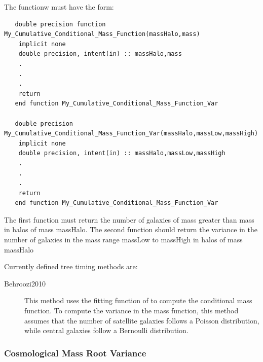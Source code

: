 The functionw must have the form:
\begin{verbatim}
   double precision function My_Cumulative_Conditional_Mass_Function(massHalo,mass)
    implicit none
    double precision, intent(in) :: massHalo,mass
    .
    .
    .
    return
   end function My_Cumulative_Conditional_Mass_Function_Var

   double precision My_Cumulative_Conditional_Mass_Function_Var(massHalo,massLow,massHigh)
    implicit none
    double precision, intent(in) :: massHalo,massLow,massHigh
    .
    .
    .
    return
   end function My_Cumulative_Conditional_Mass_Function_Var 
\end{verbatim}
The first function must return the number of galaxies of mass greater than {\normalfont \ttfamily mass} in halos of mass {\normalfont \ttfamily massHalo}. The second function should return the variance in the number of galaxies in the mass range {\normalfont \ttfamily massLow} to {\normalfont \ttfamily massHigh} in halos of mass {\normalfont \ttfamily massHalo}

Currently defined tree timing methods are:
\begin{description}
 \item [{\normalfont \ttfamily Behroozi2010}] This method uses the fitting function of \cite{behroozi_comprehensive_2010} to compute the conditional mass function. To compute the variance in the mass function, this method assumes that the number of satellite galaxies follows a Poisson distribution, while central galaxies follow a \gls{Bernoulli distribution}.
\end{description}

\subsubsection{Cosmological Mass Root Variance}

